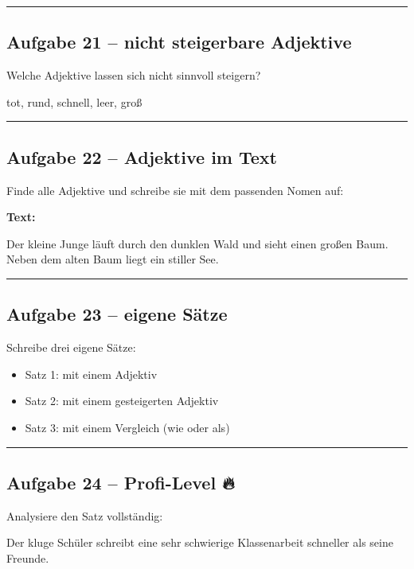 \documentclass[a4paper,12pt]{article}
\newcommand{\linie}{\vspace{4pt}\hrule\vspace{10pt}}
\begin{document}
\linie

\subsection*{Aufgabe 21 – nicht steigerbare Adjektive}

Welche Adjektive lassen sich nicht sinnvoll steigern?

tot, rund, schnell, leer, groß

\linie

\subsection*{Aufgabe 22 – Adjektive im Text}

Finde alle Adjektive und schreibe sie mit dem passenden Nomen auf:

\textbf{Text:}

Der kleine Junge läuft durch den dunklen Wald und sieht einen großen Baum.  
Neben dem alten Baum liegt ein stiller See.

\vspace{20pt}

\linie

\subsection*{Aufgabe 23 – eigene Sätze}

Schreibe drei eigene Sätze:

\begin{itemize}
\item Satz 1: mit einem Adjektiv
\item Satz 2: mit einem gesteigerten Adjektiv
\item Satz 3: mit einem Vergleich (wie oder als)
\end{itemize}

\linie

\subsection*{Aufgabe 24 – Profi-Level 🔥}

Analysiere den Satz vollständig:

Der kluge Schüler schreibt eine sehr schwierige Klassenarbeit schneller als seine Freunde.
\end{document}
